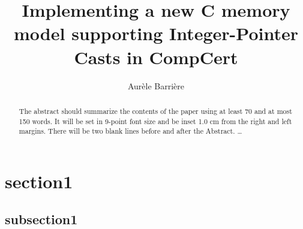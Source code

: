 \documentclass{llncs2e/llncs}
\begin{document}
%
\pagestyle{headings}  %
%
\title{Implementing a new C memory model supporting Integer-Pointer Casts in CompCert}
%
\author{Aur\`ele Barri\`ere}
%
%

\maketitle              %


\begin{abstract}
The abstract should summarize the contents of the paper
using at least 70 and at most 150 words. It will be set in 9-point
font size and be inset 1.0 cm from the right and left margins.
There will be two blank lines before and after the Abstract. \dots
{}
\end{abstract}
%
\section{section1}
%

%
\subsection{subsection1}
%

%
%
\end{document}
